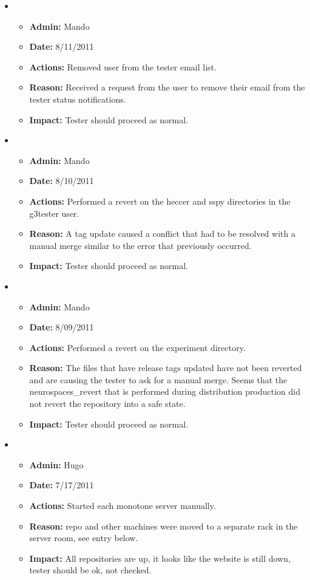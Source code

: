 \documentclass[12pt]{article}
\begin{document}
\begin{itemize}
\item
  \begin{itemize}
  \item[] {\bf Admin:} Mando
  \item[] {\bf Date:} 8/11/2011
  \item[] {\bf Actions:} Removed user from the tester email list. 
  \item[] {\bf Reason:} Received a request from the user to remove their email from the tester status notifications.
  \item[] {\bf Impact:} Tester should proceed as normal.
  \end{itemize}
  
\item
  \begin{itemize}
  \item[] {\bf Admin:} Mando
  \item[] {\bf Date:} 8/10/2011
  \item[] {\bf Actions:} Performed a revert on the heccer and sspy directories in the g3tester user. 
  \item[] {\bf Reason:} A tag update caused a conflict that had to be resolved with a manual merge similar to the error that previously occurred.
  \item[] {\bf Impact:} Tester should proceed as normal.
  \end{itemize}
  
\item
  \begin{itemize}
  \item[] {\bf Admin:} Mando
  \item[] {\bf Date:} 8/09/2011
  \item[] {\bf Actions:} Performed a revert on the experiment directory. 
  \item[] {\bf Reason:} The files that have release tags updated have not been reverted and are causing the tester to ask for a manual merge. Seems that
  the neurospaces\_revert that is performed during distribution production did not revert the repository into a safe state.
  \item[] {\bf Impact:} Tester should proceed as normal.
  \end{itemize}
  
\item
  \begin{itemize}
  \item[] {\bf Admin:} Hugo
  \item[] {\bf Date:} 7/17/2011
  \item[] {\bf Actions:} Started each monotone server manually.
  \item[] {\bf Reason:} repo and other machines were moved to a
    separate rack in the server room, see entry below.
  \item[] {\bf Impact:} All repositories are up, it looks like the
    website is still down, tester should be ok, not checked.
  \end{itemize}
  

\end{itemize}
\end{document}
